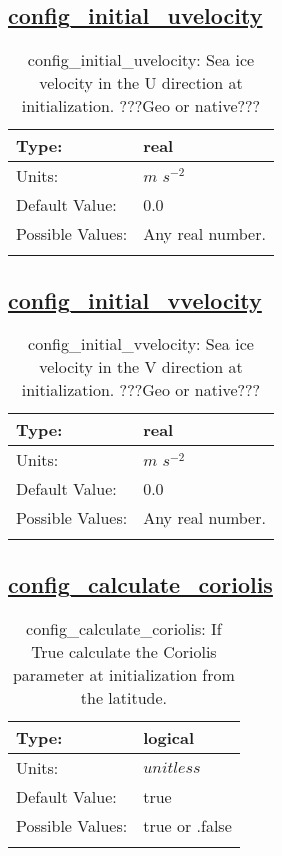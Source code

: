 \subsection[config\_initial\_uvelocity]{\hyperref[sec:nm_tab_initialize]{config\_initial\_uvelocity}}
\label{subsec:nm_sec_config_initial_uvelocity}
\begin{center}
\begin{longtable}{| p{2.0in} || p{4.0in} |}
    \hline
    Type: & real \\
    \hline
    Units: & $m$ $s^{-2}$ \\
    \hline
    Default Value: & 0.0 \\
    \hline
    Possible Values: & Any real number. \\
    \hline
    \caption{config\_initial\_uvelocity: Sea ice velocity in the U direction at initialization. ???Geo or native???}
\end{longtable}
\end{center}
\subsection[config\_initial\_vvelocity]{\hyperref[sec:nm_tab_initialize]{config\_initial\_vvelocity}}
\label{subsec:nm_sec_config_initial_vvelocity}
\begin{center}
\begin{longtable}{| p{2.0in} || p{4.0in} |}
    \hline
    Type: & real \\
    \hline
    Units: & $m$ $s^{-2}$ \\
    \hline
    Default Value: & 0.0 \\
    \hline
    Possible Values: & Any real number. \\
    \hline
    \caption{config\_initial\_vvelocity: Sea ice velocity in the V direction at initialization. ???Geo or native???}
\end{longtable}
\end{center}
\subsection[config\_calculate\_coriolis]{\hyperref[sec:nm_tab_initialize]{config\_calculate\_coriolis}}
\label{subsec:nm_sec_config_calculate_coriolis}
\begin{center}
\begin{longtable}{| p{2.0in} || p{4.0in} |}
    \hline
    Type: & logical \\
    \hline
    Units: & $unitless$ \\
    \hline
    Default Value: & true \\
    \hline
    Possible Values: & true or .false \\
    \hline
    \caption{config\_calculate\_coriolis: If True calculate the Coriolis parameter at initialization from the latitude.}
\end{longtable}
\end{center}

